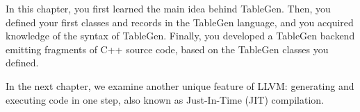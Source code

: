 
In this chapter, you first learned the main idea behind TableGen. Then, you defined your first classes and records in the TableGen language, and you acquired knowledge of the syntax of TableGen. Finally, you developed a TableGen backend emitting fragments of C++ source code, based on the TableGen classes you defined.

In the next chapter, we examine another unique feature of LLVM: generating and executing code in one step, also known as Just-In-Time (JIT) compilation.

